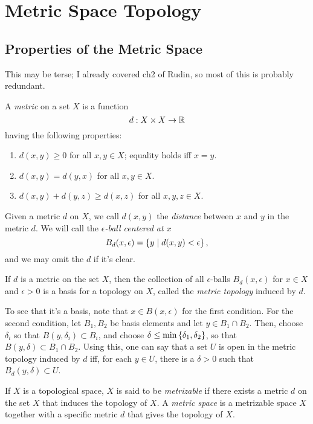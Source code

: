 \documentclass[10pt]{report}
\begin{document}
\section{Metric Space Topology}
\subsection{Properties of the Metric Space}
This may be terse;
I already covered ch2 of Rudin, so most of this is probably redundant.
\begin{definition}
  A \emph{metric} on a set $X$ is a function
  \[
    d: X \times X \rightarrow \mathbb{R}
  \]
  having the following properties:
  \begin{enumerate}[label={(\arabic*)}]
    \item $d(x,y) \geq 0$ for all $x,y \in X$; equality holds iff $x = y$.
    \item $d(x,y) = d(y,x)$ for all $x,y \in X$.
    \item $d(x,y) + d(y,z) \geq d(x,z)$ for all $x,y,z \in X$.
  \end{enumerate}
\end{definition}

Given a metric $d$ on $X$, we call $d(x,y)$ the \emph{distance} between $x$ and $y$ in the metric $d$.
We will call the \emph{$\epsilon$-ball centered at $x$}
\[
  B_d(x,\epsilon) = \left\{ y \mid d(x,y) < \epsilon \right\},
\]
and we may omit the $d$ if it's clear.

\begin{definition}
  If $d$ is a metric on the set $X$, then the collection of all $\epsilon$-balls $B_d(x,\epsilon)$ for $x \in X$ and $\epsilon > 0$ is a basis for a topology on $X$, called the \emph{metric topology} induced by $d$.
\end{definition}

To see that it's a basis, note that $x \in B(x,\epsilon)$ for the first condition.
For the second condition, let $B_1,B_2$ be basis elements and let $y \in B_1 \cap B_2$.
Then, choose $\delta_i$ so that $B(y,\delta_i) \subset B_i$, and choose $\delta \leq \min \left\{ \delta_1, \delta_2 \right\}$, so that $B(y,\delta) \subset B_1 \cap B_2$.
Using this, one can say that a set $U$ is open in the metric topology induced by $d$ iff, for each $y \in U$, there is a $\delta > 0$ such that $B_d(y,\delta) \subset U$.

\begin{definition}
  If $X$ is a topological space, $X$ is said to be \emph{metrizable} if there exists a metric $d$ on the set $X$ that induces the topology of $X$.
  A \emph{metric space} is a metrizable space $X$ together with a specific metric $d$ that gives the topology of $X$.
\end{definition}
\end{document}
